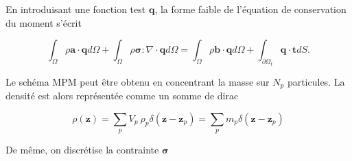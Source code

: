 
En introduisant une fonction test $\bm q$, la forme faible de l'équation de conservation du moment s'écrit

\begin{equation*}
    \int_\Omega \rho \bm a \cdot \bm q d\Omega + \int_\Omega \rho \bm \sigma : \nabla \cdot \bm q d\Omega = \int_\Omega \rho \bm b\cdot \bm q d\Omega + \int_{\partial \Omega_t} \bm q \cdot \bm t dS.
\end{equation*}

Le schéma MPM peut être obtenu en concentrant la masse sur $N_p$ particules. La densité est alors représentée comme un somme de dirac

\begin{equation*}
    \rho(\bm z) = \sum_p V_p~\rho_p \delta(\bm z - \bm z_p) = \sum_p m_p \delta(\bm z - \bm z_p)
\end{equation*}

De même, on discrétise la contrainte $\bm \sigma$

